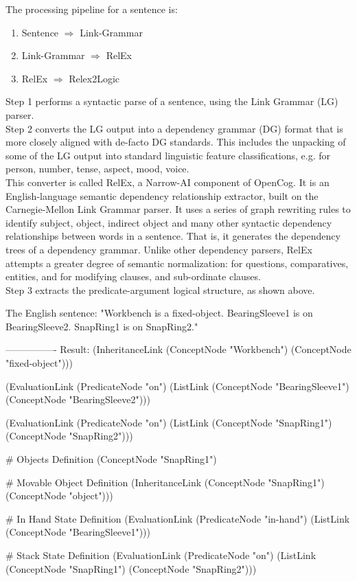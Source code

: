 The processing pipeline for a sentence is: 
\begin{enumerate}
	\item Sentence $\Rightarrow$ Link-Grammar
	\item Link-Grammar $\Rightarrow$ RelEx
	\item RelEx $\Rightarrow$ Relex2Logic
\end{enumerate}

Step 1 performs a syntactic parse of a sentence, using the Link Grammar (LG) parser. \\
Step 2 converts the LG output into a dependency grammar (DG) format that is more closely aligned with de-facto DG standards. This includes the unpacking of some of the LG output into standard linguistic feature classifications, e.g. for person, number, tense, aspect, mood, voice. \\
This converter is called RelEx, a Narrow-AI component of OpenCog. It is an English-language semantic dependency relationship extractor, built on the Carnegie-Mellon Link Grammar parser. It uses a series of graph rewriting rules to identify subject, object, indirect object and many other syntactic dependency relationships between words in a sentence. That is, it generates the dependency trees of a dependency grammar. 
Unlike other dependency parsers, RelEx attempts a greater degree of semantic normalization: for questions, comparatives, entities, and for modifying clauses, and sub-ordinate clauses. \\
Step 3 extracts the predicate-argument logical structure, as shown above.



\begin{python}
The English sentence: 
"Workbench is a fixed-object. 
BearingSleeve1 is on BearingSleeve2. 
SnapRing1 is on SnapRing2."

---------------- Result:
(InheritanceLink
    (ConceptNode "Workbench")
    (ConceptNode "fixed-object")))

(EvaluationLink
  (PredicateNode "on")
  (ListLink
    (ConceptNode "BearingSleeve1")
    (ConceptNode "BearingSleeve2")))

(EvaluationLink
  (PredicateNode "on")
  (ListLink
    (ConceptNode "SnapRing1")
    (ConceptNode "SnapRing2")))
\end{python}
    

\begin{python}
# Objects Definition
(ConceptNode "SnapRing1")       

# Movable Object Definition  
(InheritanceLink
    (ConceptNode "SnapRing1")
    (ConceptNode "object")))

# In Hand State Definition  
(EvaluationLink
  (PredicateNode "in-hand")
  (ListLink
    (ConceptNode "BearingSleeve1")))

# Stack State Definition  
(EvaluationLink
  (PredicateNode "on")
  (ListLink
    (ConceptNode "SnapRing1")
    (ConceptNode "SnapRing2")))
\end{python}